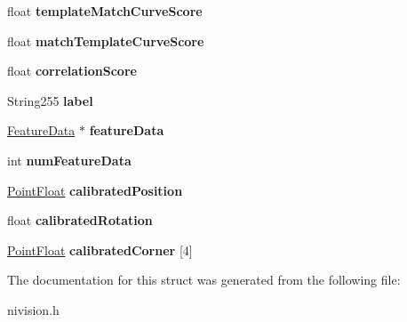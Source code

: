 \begin{DoxyCompactItemize}
\item 
\hypertarget{structGeometricPatternMatch2__struct_a71e61add974dcbc7cfad041828a15992}{
float {\bfseries templateMatchCurveScore}}
\label{structGeometricPatternMatch2__struct_a71e61add974dcbc7cfad041828a15992}

\item 
\hypertarget{structGeometricPatternMatch2__struct_ac0fecb6533a62b07ce5b3c9c61317c89}{
float {\bfseries matchTemplateCurveScore}}
\label{structGeometricPatternMatch2__struct_ac0fecb6533a62b07ce5b3c9c61317c89}

\item 
\hypertarget{structGeometricPatternMatch2__struct_abd8544b12501d186ce30dc5d4dd6628c}{
float {\bfseries correlationScore}}
\label{structGeometricPatternMatch2__struct_abd8544b12501d186ce30dc5d4dd6628c}

\item 
\hypertarget{structGeometricPatternMatch2__struct_a9ee0ddccfc043e6ec109a44f70bd7b21}{
String255 {\bfseries label}}
\label{structGeometricPatternMatch2__struct_a9ee0ddccfc043e6ec109a44f70bd7b21}

\item 
\hypertarget{structGeometricPatternMatch2__struct_a3dcfd4d7732d40fd62af19e227eef5ed}{
\hyperlink{structFeatureData__struct}{FeatureData} $\ast$ {\bfseries featureData}}
\label{structGeometricPatternMatch2__struct_a3dcfd4d7732d40fd62af19e227eef5ed}

\item 
\hypertarget{structGeometricPatternMatch2__struct_aaf7c1f584ade1ad566e0e20e83ef44d8}{
int {\bfseries numFeatureData}}
\label{structGeometricPatternMatch2__struct_aaf7c1f584ade1ad566e0e20e83ef44d8}

\item 
\hypertarget{structGeometricPatternMatch2__struct_af37b334c1b85be2e4b10f01eb6652f57}{
\hyperlink{structPointFloat__struct}{PointFloat} {\bfseries calibratedPosition}}
\label{structGeometricPatternMatch2__struct_af37b334c1b85be2e4b10f01eb6652f57}

\item 
\hypertarget{structGeometricPatternMatch2__struct_a1b53ac9ff1add7b5d653b8712b8c510b}{
float {\bfseries calibratedRotation}}
\label{structGeometricPatternMatch2__struct_a1b53ac9ff1add7b5d653b8712b8c510b}

\item 
\hypertarget{structGeometricPatternMatch2__struct_aafb108f4173e57bb17060fde16640050}{
\hyperlink{structPointFloat__struct}{PointFloat} {\bfseries calibratedCorner} \mbox{[}4\mbox{]}}
\label{structGeometricPatternMatch2__struct_aafb108f4173e57bb17060fde16640050}

\end{DoxyCompactItemize}


The documentation for this struct was generated from the following file:\begin{DoxyCompactItemize}
\item 
nivision.h\end{DoxyCompactItemize}
